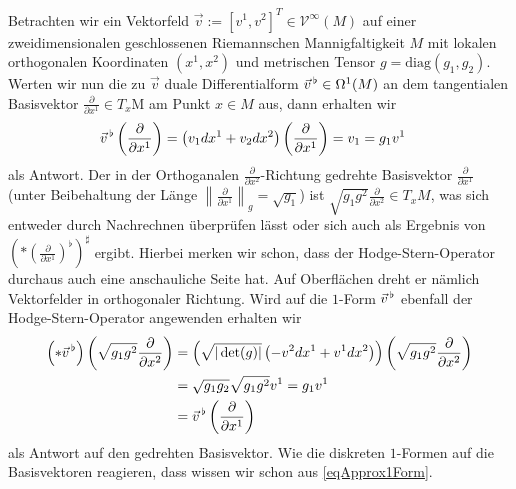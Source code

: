  Betrachten wir ein Vektorfeld \( \vec{v}:= \left[ v^{1}, v^{2} \right]^{T} \in \mathcal{V}^{\infty}(M) \) auf einer zweidimensionalen geschlossenen Riemannschen Mannigfaltigkeit \( M \)
  mit lokalen orthogonalen Koordinaten \( \left( x^{1}, x^{2} \right) \) und metrischen Tensor \( g=\text{diag}(g_{1}, g_{2})\).
  Werten wir nun die zu \( \vec{v} \) duale Differentialform \( \vec{v}^{\,\flat}\in\Omega^{1}(M) \) an dem tangentialen Basisvektor
  \( \frac{\partial}{\partial x^{1}}\in T_{x}\)M am Punkt \( x\in M \) aus,
  dann erhalten wir
  \begin{align}
    \vec{v}^{\,\flat}\left( \frac{\partial}{\partial x^{1}} \right) &= \left( v_{1}dx^{1} + v_{2}dx^{2} \right)\left(\frac{\partial}{\partial x^{1}}  \right)
                                                                   = v_{1} = g_{1}v^{1}
  \end{align}
  als Antwort.
  Der in der Orthoganalen \( \frac{\partial}{\partial x^{2}} \)-Richtung gedrehte Basisvektor \( \frac{\partial}{\partial x^{1}} \) 
  (unter Beibehaltung der Länge \( \left\|\frac{\partial}{\partial x^{1}}\right\|_{g} = \sqrt{g_{1}}  \)) ist 
  \( \sqrt{g_{1}g^{2}} \frac{\partial}{\partial x^{2}} \in T_{x}M\), 
  was sich entweder durch Nachrechnen überprüfen lässt oder sich auch als Ergebnis von 
  \( \left( * \left( \frac{\partial}{\partial x^{1}} \right)^{\flat} \right)^{\sharp} \) ergibt.
  Hierbei merken wir schon, dass der Hodge-Stern-Operator durchaus auch eine anschauliche Seite hat.
  Auf Oberflächen dreht er nämlich Vektorfelder in orthogonaler Richtung.
  Wird auf die \( 1\)-Form \( \vec{v}^{\,\flat} \) ebenfall der Hodge-Stern-Operator angewenden erhalten wir
  \begin{align}
  \begin{aligned}
    \left( *\vec{v}^{\,\flat} \right)\left( \sqrt{g_{1}g^{2}} \frac{\partial}{\partial x^{2}} \right)
                &= \left(\sqrt{|\det(g)|} \left(-v^{2}dx^{1} + v^{1}dx^{2}  \right) \right)\left( \sqrt{g_{1}g^{2}} \frac{\partial}{\partial x^{2}} \right) \\
                &= \sqrt{g_{1}g_{2}} \sqrt{g_{1}g^{2}} v^{1}
                 = g_{1}v^{1} \\
                &= \vec{v}^{\,\flat}\left( \frac{\partial}{\partial x^{1}} \right)
  \end{aligned}
  \end{align}
  als Antwort auf den gedrehten Basisvektor.
  Wie die diskreten \( 1 \)-Formen auf die Basisvektoren reagieren, dass wissen wir schon aus \eqref{eqApprox1Form}.
